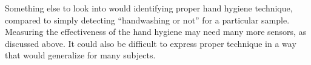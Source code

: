 \documentclass[]{report}
\begin{document}
Something else to look into would identifying proper hand hygiene technique, compared to simply detecting ``handwashing or not'' for a particular sample. Measuring the effectiveness of the hand hygiene may need many more sensors, as discussed above. It could also be difficult to express proper technique in a way that would generalize for many subjects.










\end{document}
